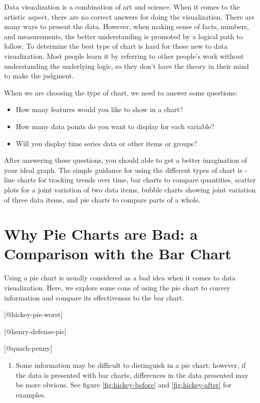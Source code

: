 \documentclass[]{book}
\providecommand{\tightlist}{%
  \setlength{\itemsep}{0pt}\setlength{\parskip}{0pt}}
\theoremstyle{definition}
\theoremstyle{definition}
\theoremstyle{definition}
\theoremstyle{remark}
\begin{document}
Data visualization is a combination of art and science. When it comes to
the artistic aspect, there are no correct answers for doing the
visualization. There are many ways to present the data. However, when
making sense of facts, numbers, and measurements, the better
understanding is promoted by a logical path to follow. To determine the
best type of chart is hard for those new to data visualization. Most
people learn it by referring to other people's work without
understanding the underlying logic, so they don't have the theory in
their mind to make the judgment.

When we are choosing the type of chart, we need to answer some
questions:

\begin{itemize}
\tightlist
\item
  How many features would you like to show in a chart?
\item
  How many data points do you want to display for each variable?
\item
  Will you display time series data or other items or groups?
\end{itemize}

After answering these questions, you should able to get a better
imagination of your ideal graph. The simple guidance for using the
different types of chart is - line charts for tracking trends over time,
bar charts to compare quantities, scatter plots for a joint variation of
two data items, bubble charts showing joint variation of three data
items, and pie charts to compare parts of a whole.

\section{Why Pie Charts are Bad: a Comparison with the Bar
Chart}\label{why-pie-charts-are-bad-a-comparison-with-the-bar-chart}

Using a pie chart is usually considered as a bad idea when it comes to
data visualization. Here, we explore some cons of using the pie chart to
convey information and compare its effectiveness to the bar chart.

{[}@hickey-pie-worst{]}

{[}@henry-defense-pie{]}

{[}@quach-penny{]}

\begin{enumerate}
\def\labelenumi{\arabic{enumi}.}
\tightlist
\item
  Some information may be difficult to distinguish in a pie chart;
  however, if the data is presented with bar charts, differences in the
  data presented may be more obvious. See figure \ref{fig:hickey-before}
  and \ref{fig:hickey-after} for examples.
\end{enumerate}
\end{document}
